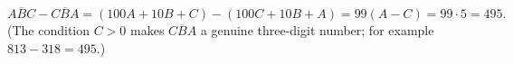 \[
\overline{ABC}-\overline{CBA}=(100A+10B+C)-(100C+10B+A)=99(A-C)=99\cdot5=\boxed{495}.
\]
(The condition $C>0$ makes $\overline{CBA}$ a genuine three-digit number; for example $813-318=495$.)

